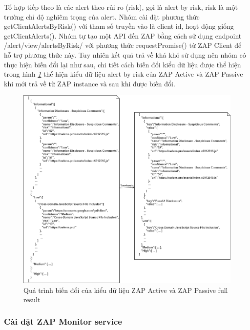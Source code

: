 \begin{itemize}
        Tổ hợp tiếp theo là các alert theo rủi ro (risk), gọi là alert by risk, risk là một trường chỉ độ nghiêm trọng của alert.
        Nhóm cài đặt phương thức getClientAlertsByRisk() với tham số truyền vào là client id, hoạt động giống getClientAlerts().
        Nhóm tự tạo một API đến ZAP bằng cách sử dụng endpoint /alert/view/alertsByRisk/ với phương thức requestPromise() từ ZAP Client để hỗ trợ phương thức này.
        Tuy nhiên kết quả trả về khá khó sử dụng nên nhóm có thực hiện biến đổi lại như sau, chi tiết cách biến đổi kiểu dữ liệu được thể hiện trong hình \textit{\ref{fig:ActiveTransformData} } thể hiện kiểu dữ liệu alert by risk của ZAP Active và ZAP Passive khi mới trả về từ ZAP instance và sau khi được biến đổi.
        \begin{figure}[H]
          \centering
          \includegraphics[width=\textwidth]{applied-thesis-chapters/chapter-4/Quá trình biến đổi của kiểu dữ liệu ZAP Active và ZAP Passive full result.png}
          \caption{Quá trình biến đổi của kiểu dữ liệu ZAP Active và ZAP Passive full result}
          \label{fig:ActiveTransformData}
        \end{figure}
\end{itemize}

\subsubsection{Cài đặt ZAP Monitor service}

